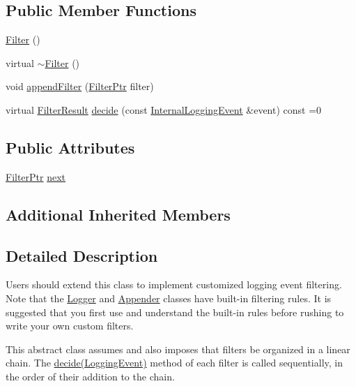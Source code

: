 \subsection*{Public Member Functions}
\begin{DoxyCompactItemize}
\item 
\hyperlink{classlog4cplus_1_1spi_1_1Filter_acbdc515a91d5fd7f5c03b3225a1593ac}{Filter} ()
\item 
virtual \hyperlink{classlog4cplus_1_1spi_1_1Filter_a8c78932b14954d46a03c8865e624f2ec}{$\sim$\-Filter} ()
\item 
void \hyperlink{classlog4cplus_1_1spi_1_1Filter_a978f9027c1da32af99b517cbbc0657b0}{append\-Filter} (\hyperlink{namespacelog4cplus_1_1spi_abfdea757523ce8fe4598502a29bc7545}{Filter\-Ptr} filter)
\item 
virtual \hyperlink{namespacelog4cplus_1_1spi_aa910f475d36c00f943ef78e37d11e3f6}{Filter\-Result} \hyperlink{classlog4cplus_1_1spi_1_1Filter_a728348e762ea1c10e30102503f6aa7a6}{decide} (const \hyperlink{classlog4cplus_1_1spi_1_1InternalLoggingEvent}{Internal\-Logging\-Event} \&event) const =0
\end{DoxyCompactItemize}
\subsection*{Public Attributes}
\begin{DoxyCompactItemize}
\item 
\hyperlink{namespacelog4cplus_1_1spi_abfdea757523ce8fe4598502a29bc7545}{Filter\-Ptr} \hyperlink{classlog4cplus_1_1spi_1_1Filter_ac78a9de8a5b0536fdb165fbb40af9504}{next}
\end{DoxyCompactItemize}
\subsection*{Additional Inherited Members}


\subsection{Detailed Description}
Users should extend this class to implement customized logging event filtering. Note that the \hyperlink{classlog4cplus_1_1Logger}{Logger} and \hyperlink{classlog4cplus_1_1Appender}{Appender} classes have built-\/in filtering rules. It is suggested that you first use and understand the built-\/in rules before rushing to write your own custom filters.

This abstract class assumes and also imposes that filters be organized in a linear chain. The \hyperlink{classlog4cplus_1_1spi_1_1Filter_a728348e762ea1c10e30102503f6aa7a6}{decide(\-Logging\-Event)} method of each filter is called sequentially, in the order of their addition to the chain.

